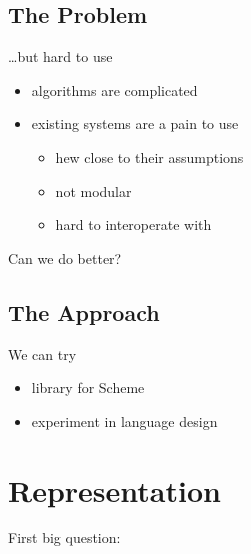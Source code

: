 \documentclass{beamer}
\begin{document}
\subsection{The Problem}

\begin{frame}
  
  {\huge \ldots but hard to use}

  \begin{itemize}
  \item algorithms are complicated
  \item existing systems are a pain to use
    \begin{itemize}
    \item hew close to their assumptions
    \item not modular
    \item hard to interoperate with
    \end{itemize}
  \end{itemize}
\end{frame}

\begin{frame}
\begin{center}
\Huge Can we do better?
\end{center}
\end{frame}

\subsection{The Approach}

\begin{frame}

\vspace{0.40in}
\begin{center}
\Huge We can try
\end{center}

\pause
  \begin{itemize}
  \item library for Scheme
  \item experiment in language design
  \end{itemize}
\end{frame}

\section{Representation}

\begin{frame}
\begin{center}
\Huge First big question:
\end{center}
\end{frame}
\end{document}
